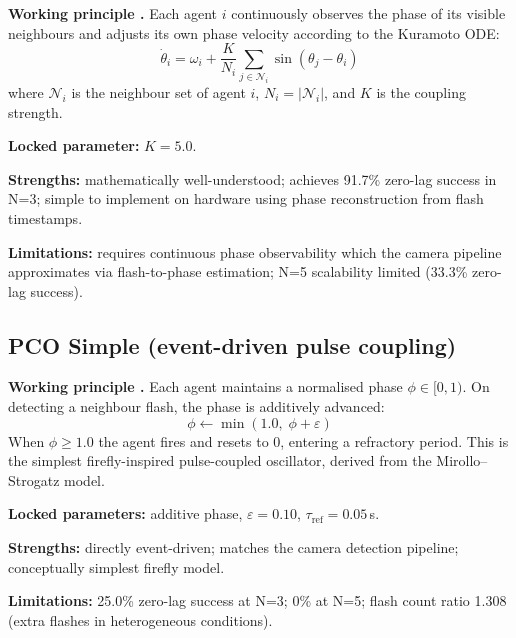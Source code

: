 \documentclass[11pt,a4paper]{article}
\begin{document}
\textbf{Working principle \cite{kuramoto1975self}.}
Each agent $i$ continuously observes the phase of its visible neighbours
and adjusts its own phase velocity according to the Kuramoto ODE:
\begin{equation}
  \dot\theta_i = \omega_i + \frac{K}{N_i}\sum_{j\in\mathcal{N}_i}
                 \sin(\theta_j - \theta_i)
\end{equation}
where $\mathcal{N}_i$ is the neighbour set of agent $i$, $N_i = |\mathcal{N}_i|$,
and $K$ is the coupling strength.

\textbf{Locked parameter:} $K = 5.0$.

\textbf{Strengths:} mathematically well-understood; achieves 91.7\% zero-lag
success in N=3; simple to implement on hardware using phase reconstruction
from flash timestamps.

\textbf{Limitations:} requires continuous phase observability which the
camera pipeline approximates via flash-to-phase estimation; N=5 scalability
limited (33.3\% zero-lag success).

\subsection{PCO Simple (event-driven pulse coupling)}

\textbf{Working principle \cite{peskin1975mathematical,mirollo1990synchronization}.}
Each agent maintains a normalised phase $\phi \in [0,1)$.  On detecting a
neighbour flash, the phase is additively advanced:
\begin{equation}
  \phi \leftarrow \min(1.0,\; \phi + \varepsilon)
\end{equation}
When $\phi \geq 1.0$ the agent fires and resets to 0, entering a refractory
period.  This is the simplest firefly-inspired pulse-coupled oscillator,
derived from the Mirollo--Strogatz model.

\textbf{Locked parameters:} additive phase, $\varepsilon = 0.10$,
$\tau_{\text{ref}} = 0.05$\,s.

\textbf{Strengths:} directly event-driven; matches the camera detection
pipeline; conceptually simplest firefly model.

\textbf{Limitations:} 25.0\% zero-lag success at N=3; 0\% at N=5;
flash count ratio 1.308 (extra flashes in heterogeneous conditions).

\end{document}
